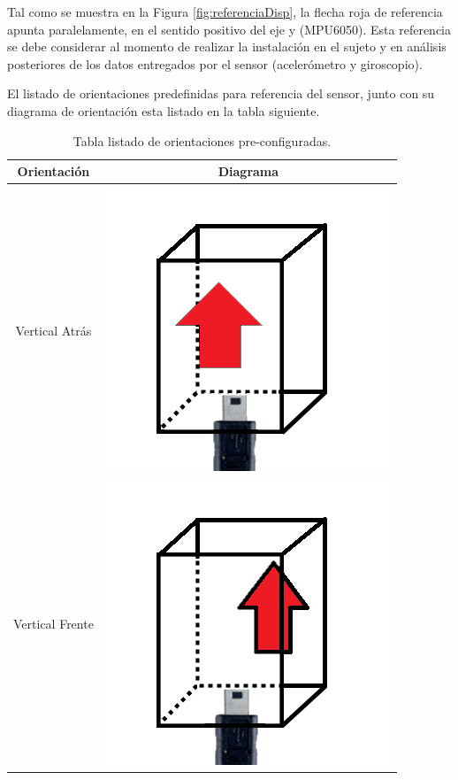 \documentclass[12pt,a4paper]{article}
\begin{document}
Tal como se muestra en la Figura \ref{fig:referenciaDisp}, la flecha roja de referencia apunta paralelamente, en el sentido positivo del eje y (MPU6050).
Esta referencia se debe considerar al momento de realizar la instalación en el sujeto y en análisis posteriores de los datos entregados por el sensor (acelerómetro y giroscopio).

\newpage

El listado de orientaciones predefinidas para referencia del sensor, junto con su diagrama de orientación esta listado en la tabla siguiente.

\begin{table}[H]
	\centering
	\caption{Tabla listado de orientaciones pre-configuradas.}
	\begin{tabular}{|c|c|}
		\hline 
		\textbf{Orientación} & \textbf{Diagrama} \\ 
		\hline 
		Vertical Atrás &  \includegraphics[scale=0.2]{images/IMU/verticalatras}\\ 
		\hline 
		Vertical Frente  &  \includegraphics[scale=0.2]{images/IMU/verticalfrente} \\ 

\end{tabular}
\end{table}
\end{document}
